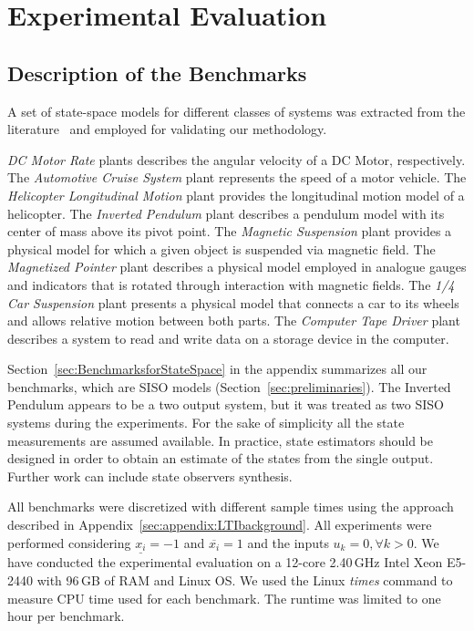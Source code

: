 \documentclass[runningheads,a4paper]{llncs}
\begin{document}
\section{Experimental Evaluation}

\subsection{Description of the Benchmarks}
\label{experimental-setup}

A set of state-space models for different classes of systems was extracted
from the literature~\cite{Franklin15, maglev, converters, CTMS} and employed
for validating our methodology.

\textit{DC Motor Rate} plants describes the angular velocity of a DC Motor, respectively. 
The \textit{Automotive Cruise System} plant represents the speed of a motor vehicle. 
The \textit{Helicopter Longitudinal Motion} plant provides the longitudinal motion model 
of a helicopter. 
The \textit{Inverted Pendulum} plant describes a pendulum model
with its center of mass above its pivot point. 
The \textit{Magnetic Suspension} plant provides a physical model for which 
a given object is suspended via magnetic field. 
The \textit{Magnetized Pointer} plant describes a physical model employed in analogue gauges 
and indicators that is rotated through interaction with magnetic fields.
The \textit{1/4 Car Suspension} plant presents a physical model that connects a car to its wheels 
and allows relative motion between both parts.
The \textit{Computer Tape Driver} plant describes a system to read and write data 
on a storage device in the computer.

Section~\ref{sec:BenchmarksforStateSpace} in the appendix summarizes all our
benchmarks, which are SISO models (Section~\ref{sec:preliminaries}).  The
Inverted Pendulum appears to be a two output system, but it was treated as
two SISO systems during the experiments.  For the sake of simplicity all the
state measurements are assumed available.  In practice, state estimators
should be designed in order to obtain an estimate of the states from the
single output.  Further work can include state observers synthesis.

All benchmarks were discretized with different sample times using 
the approach described in Appendix~\ref{sec:appendix:LTIbackground}. 
All experiments were performed considering $\underline{x_{i}}=-1$ and 
$\overline{x_{i}}=1$ and the inputs $u_{k}=0, \forall k>0$.
We have conducted the experimental evaluation on a 12-core 2.40\,GHz Intel
Xeon E5-2440 with 96\,GB of RAM and Linux OS.  We used the Linux
\emph{times} command to measure CPU time used for each benchmark.  The
runtime was limited to one hour per benchmark.
\end{document}
